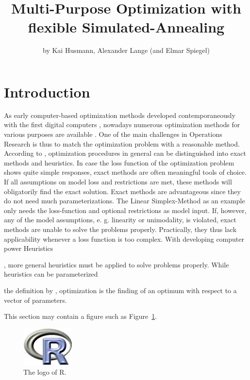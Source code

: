 \title{Multi-Purpose Optimization with flexible Simulated-Annealing}
\author{by Kai Husmann, Alexander Lange (and Elmar Spiegel)}

\maketitle


\section{Introduction}

As early computer-based optimization methods developed contemporaneously with the first digital computers \citep{Corana.1987}, nowadays numerous optimization methods for various purposes are available \citep{Wegener.2005}. One of the main challenges in Operations Research is thus to match the optimization problem with a reasonable method. According to  \citet{Kirkpatrick.1983}, optimization procedures in general can be distinguished into exact methods and heuristics. In case the loss function of the optimization problem shows quite simple responses, exact methods are often meaningful tools of choice. If all assumptions on model loss and restrictions are met, these methods will obligatorily find the exact solution. 
Exact methods are advantageous since they do not need much parameterizations. The  Linear Simplex-Method \citep{Dantzig.1959} as an example only needs the loss-function and optional restrictions as model input. If, however, any of the model assumptions, e. g. linearity or unimodality, is violated, exact methods are unable to solve the problems properly. Practically, they thus lack applicability whenever a loss function is too complex. With developing computer power 
Heuristics

, more general heuristics must be applied to solve problems properly. While heuristics can be parameterized

the definition by \citet{Pronzato.1984}, optimization is the finding of an optimum with respect to a vector of parameters.

This section may contain a figure such as Figure~\ref{figure:rlogo}.

\begin{figure}[htbp]
  \centering
  \includegraphics{Fig/Rlogo}
  \caption{The logo of R.}
  \label{figure:rlogo}
\end{figure}


